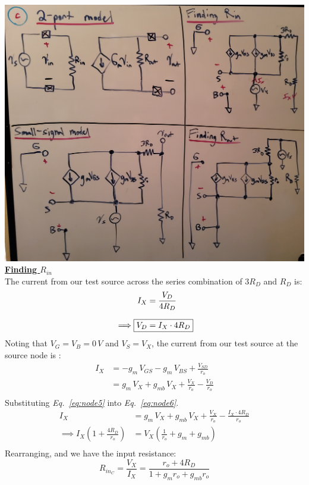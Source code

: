 \documentclass[12pt, fleqn]{article}
\begin{document}
\begin{enumerate}[label=(\alph*)]
{    \includegraphics[scale=0.1, center]{p2c.jpg}\\
    \newpage
    \underline{\textbf{Finding $R_{in}$}}\\[0.25cm]
    The current from our test source across the series combination of ${3R}_D$ and $R_D$ is:
    \begin{align}
        I_X &= \frac{V_D}{{4R}_D}\\[0.25cm]
        \implies \Aboxed{V_D &= I_X \cdot {4R}_D}
        \label{eq:node5}
    \end{align}
    Noting that $V_G = V_B = 0\,V$ and $V_S = V_X$, the current from our test source at the source node is :
    \begin{align}
        I_X &= - g_m\,V_{GS} - g_m\,V_{BS} + \frac{V_{SD}}{r_o}\\[0.25cm]
        &= g_m\,V_X + g_{mb}\,V_X + \frac{V_X}{r_o} - \frac{V_D}{r_o}\\[0.25cm]
        \label{eq:node6}
    \end{align}
    Substituting \textit{Eq.~\ref{eq:node5}} into \textit{Eq.~\ref{eq:node6}}.
    \begin{align*}
        I_X &= g_m\,V_X + g_{mb}\,V_X + \frac{V_X}{r_o} - \frac{I_X \cdot {4R}_D}{r_o}\\[0.25cm]
        \implies I_X\left(1 + \frac{{4R}_D}{r_o}\right) &= V_X\left(\frac{1}{r_o} + g_m + g_{mb}\right)\\[0.25cm]
    \end{align*}
    Rearranging, and we have the input resistance:
    \begin{equation}
        \boxed{R_{{in}_C} = \frac{V_X}{I_X} = \frac{r_o + {4R}_D}{1 + g_m r_o + g_{mb} r_o}}
    \end{equation}
    
}
\end{enumerate}
\end{document}
